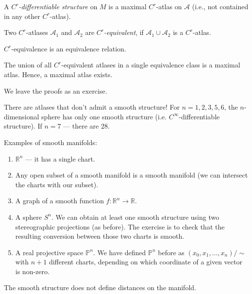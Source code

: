 \begin{definition}
    A \textit{$C^r$-differentiable structure} on $M$ is a maximal $C^r$-atlas on
    $\mathcal{A}$ (i.e., not contained in any other $C^r$-atlas).
\end{definition}
\begin{definition}
    Two $C^r$-atlases $\mathcal{A}_1$ and $\mathcal{A}_2$ are \textit{$C^r$-equivalent}, 
    if $\mathcal{A}_1 \cup \mathcal{A}_2$ is a $C^r$-atlas.
\end{definition}
\begin{proposition}
    $C^r$-equivalence is an equivalence relation.
\end{proposition}
\begin{lemma}
    The union of all $C^r$-equivalent atlases in a single equivalence class is
    a maximal atlas. Hence, a maximal atlas exists.
\end{lemma}
\begin{remark}
    We leave the proofs as an exercise.
\end{remark}

There are atlases that don't admit a smooth structure!
For $n = 1, 2, 3, 5, 6$, the $n$-dimensional sphere has only one
smooth structure (i.e. $C^\infty$-differentiable structure).
If $n = 7$ --- there are 28.

Examples of smooth manifolds:
\begin{enumerate}
    \item {
        $\mathbb{R}^n$ --- it has a single chart.
    }
    \item {
        Any open subset of a smooth manifold is a smooth manifold
        (we can intersect the charts with our subset).
    }
    \item {
        A graph of a smooth function $f : \mathbb{R}^n \to \mathbb{R}$.
    }
    \item {
        A sphere $S^n$. We can obtain at least one smooth structure
        using two stereographic projections (as before). The exercise is to check that
        the resulting conversion between those two charts is smooth.
    }
    \item {
        A real projective space $\mathbb{P}^n$. 
        We have defined $\mathbb{P}^n$ before as
        $(x_0, x_1, \dots, x_n) / \sim$ with $n + 1$ different charts,
        depending on which coordinate of a given vector is non-zero.
    }
\end{enumerate}

\begin{remark}
    The smooth structure does not define distances on the manifold.
\end{remark}


